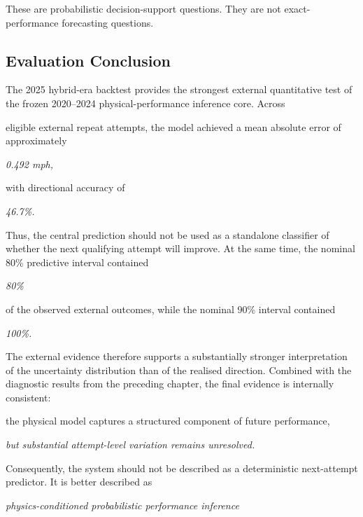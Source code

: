 These are probabilistic decision-support questions. They are not exact-performance forecasting questions.

\subsection{Evaluation Conclusion}
The 2025 hybrid-era backtest provides the strongest external quantitative test of the frozen 2020--2024 physical-performance inference core. Across

eligible external repeat attempts, the model achieved a mean absolute error of approximately

\begin{center}\textit{0.492 mph,}\end{center}

with directional accuracy of

\begin{center}\textit{46.7\%.}\end{center}

Thus, the central prediction should not be used as a standalone classifier of whether the next qualifying attempt will improve. At the same time, the nominal 80\% predictive interval contained

\begin{center}\textit{80\%}\end{center}

of the observed external outcomes, while the nominal 90\% interval contained

\begin{center}\textit{100\%.}\end{center}

The external evidence therefore supports a substantially stronger interpretation of the uncertainty distribution than of the realised direction. Combined with the diagnostic results from the preceding chapter, the final evidence is internally consistent:

the physical model captures a structured component of future performance,

\begin{center}\textit{but substantial attempt-level variation remains unresolved.}\end{center}

Consequently, the system should not be described as a deterministic next-attempt predictor. It is better described as

\begin{center}\textit{physics-conditioned probabilistic performance inference}\end{center}

